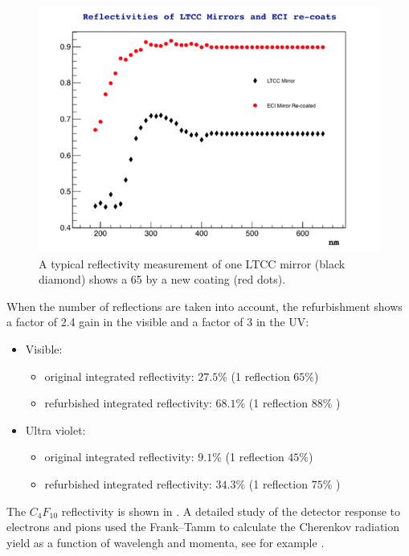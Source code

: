 \begin{figure}
	\centering
	\includegraphics[width=1.0\columnwidth,keepaspectratio]{img/reflectivityGain.png}
	\caption{A typical reflectivity measurement of one LTCC mirror (black diamond) shows a 65%
		      by a new coating (red dots). }
	\label{fig:reflectivityGain}
\end{figure}

When the number of reflections are taken into account, the refurbishment shows
a factor of 2.4 gain in the visible and a factor of 3 in the UV:

\begin{itemize}
	\item Visible:
	\begin{itemize}
		\item original integrated reflectivity: $27.5\%$ (1 reflection $65\%$)
		\item refurbished integrated reflectivity: $68.1\%$  (1 reflection $88\%$ )
	\end{itemize}
	\item Ultra violet:
	\begin{itemize}
		\item original integrated reflectivity: $9.1\%$ (1 reflection $45\%$)
		\item refurbished integrated reflectivity: $34.3\%$  (1 reflection $75\%$ )
	\end{itemize}
\end{itemize}

The $C_4F_{10}$ reflectivity is shown in . A detailed study of the detector response to electrons and pions used the Frank–Tamm to calculate
the Cherenkov radiation yield as a function of wavelengh and momenta, see for example .

